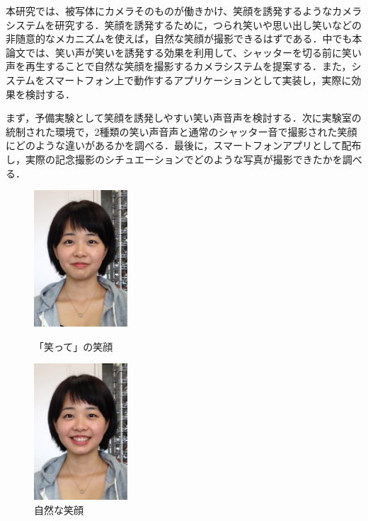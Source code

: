 \documentclass[submit,techreq]{ec2014}
\begin{document}

本研究では、被写体にカメラそのものが働きかけ、笑顔を誘発するようなカメラシステムを研究する．笑顔を誘発するために，つられ笑いや思い出し笑いなどの非随意的なメカニズムを使えば，自然な笑顔が撮影できるはずである．中でも本論文では、笑い声が笑いを誘発する効果を利用して、シャッターを切る前に笑い声を再生することで自然な笑顔を撮影するカメラシステムを提案する．また，システムをスマートフォン上で動作するアプリケーションとして実装し，実際に効果を検討する．

まず，予備実験として笑顔を誘発しやすい笑い声音声を検討する．次に実験室の統制された環境で，2種類の笑い声音声と通常のシャッター音で撮影された笑顔にどのような違いがあるかを調べる．最後に，スマートフォンアプリとして配布し，実際の記念撮影のシチュエーションでどのような写真が撮影できたかを調べる．

\begin{figure}[h]
\begin{minipage}{0.49\columnwidth}
\begin{center}
\includegraphics[width=35mm, bb=0 0 572 834]{images/cap_28.jpg}
\caption{「笑って」の笑顔}
\end{center}
\end{minipage}
\begin{minipage}{0.49\columnwidth}
\begin{center}
\includegraphics[width=35mm, bb=0 0 572 834]{images/cap_123.jpg}
\caption{自然な笑顔}
\end{center}
\end{minipage}
\end{figure}
\end{document}

